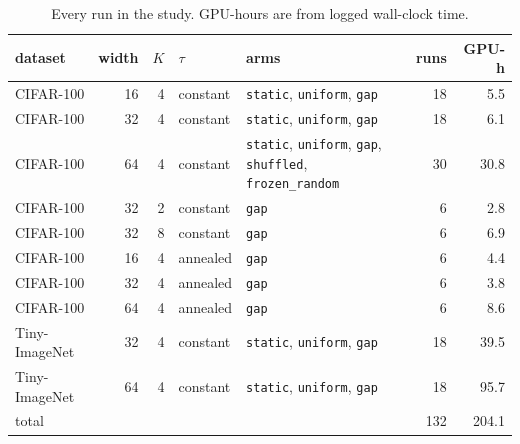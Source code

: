 \documentclass[10pt,a4paper]{article}
\begin{document}
\begin{table}[h]\centering\small
\caption{Every run in the study. GPU-hours are from logged wall-clock
time.}
\label{tab:invent}
\begin{tabular}{l r r l l r r}
\toprule
dataset & width & $K$ & $\tau$ & arms & runs & GPU-h \\
\midrule
CIFAR-100 & 16 & 4 & constant & \texttt{static}, \texttt{uniform}, \texttt{gap} & 18 & 5.5 \\
CIFAR-100 & 32 & 4 & constant & \texttt{static}, \texttt{uniform}, \texttt{gap} & 18 & 6.1 \\
CIFAR-100 & 64 & 4 & constant & \texttt{static}, \texttt{uniform}, \texttt{gap}, \texttt{shuffled}, \texttt{frozen\_random} & 30 & 30.8 \\
CIFAR-100 & 32 & 2 & constant & \texttt{gap} & 6 & 2.8 \\
CIFAR-100 & 32 & 8 & constant & \texttt{gap} & 6 & 6.9 \\
CIFAR-100 & 16 & 4 & annealed & \texttt{gap} & 6 & 4.4 \\
CIFAR-100 & 32 & 4 & annealed & \texttt{gap} & 6 & 3.8 \\
CIFAR-100 & 64 & 4 & annealed & \texttt{gap} & 6 & 8.6 \\
Tiny-ImageNet & 32 & 4 & constant & \texttt{static}, \texttt{uniform}, \texttt{gap} & 18 & 39.5 \\
Tiny-ImageNet & 64 & 4 & constant & \texttt{static}, \texttt{uniform}, \texttt{gap} & 18 & 95.7 \\
\midrule \multicolumn{5}{l}{total} & 132 & 204.1 \\
\bottomrule
\end{tabular}
\end{table}
\end{document}

